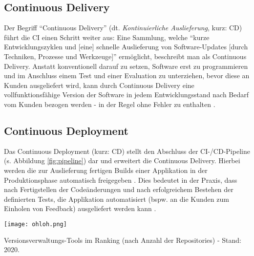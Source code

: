 \subsection{Continuous Delivery}
Der Begriff \enquote{Continuous Delivery} (dt. \textit{Kontinuierliche Auslieferung}, kurz: CD) führt die CI einen Schritt weiter aus: Eine Sammlung, welche \enquote{kurze Entwicklungszyklen und [eine] schnelle Auslieferung von Software-Updates [durch Techniken, Prozesse und Werkzeuge]} \cite{Ilanrr:2017aa}
ermöglicht, beschreibt man als Continuous Delivery. Anstatt konventionell darauf zu setzen, Software erst zu programmieren und im Anschluss einem Test und einer Evaluation zu unterziehen, bevor diese an Kunden ausgeliefert wird, kann durch Continuous Delivery eine vollfunktionsfähige Version der Software
in jedem Entwicklungsstand nach Bedarf vom Kunden bezogen werden - in der Regel ohne Fehler zu enthalten \cite{Ilanrr:2017aa}.

\subsection{Continuous Deployment}
Das Continuous Deployment (kurz: CD) stellt den Abschluss der CI-/CD-Pipeline (s. Abbildung \ref{fig:pipeline}) dar und erweitert die Continuous Delivery. Hierbei werden die zur Auslieferung fertigen Builds einer Applikation in der Produktionsphase automatisch freigegeben \cite{RedHat:2020aa}. Dies bedeutet in der Praxis,
dass nach Fertigstellen der Codeänderungen und nach erfolgreichem Bestehen der definierten Tests, die Applikation automatisiert (bspw. an die Kunden zum Einholen von Feedback) ausgeliefert werden kann \cite{RedHat:2020aa}.

\begin{marginfigure}
    \texttt{[image: ohloh.png]}
    \caption{\label{fig:ohloh}Versionsverwaltungs-Tools im Ranking (nach Anzahl der Repositories) - Stand: 2020.}
\end{marginfigure}
